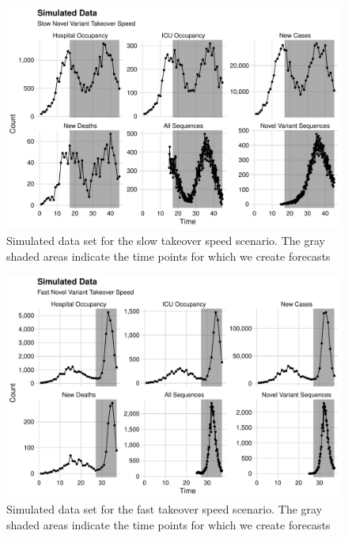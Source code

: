 \begin{figure}
    \centering
    \includegraphics[width=1.0\columnwidth]{simulated_binned_data_slow_plot}
    \caption[Simulated data set for the slow takeover speed scenario.]{Simulated data set for the slow takeover speed scenario.
    The gray shaded areas indicate the time points for which we create forecasts}
    \label{ch_5:fig:simulated_binned_data_slow_plot}
\end{figure}

\begin{figure}
    \centering
    \includegraphics[width=1.0\columnwidth]{simulated_binned_data_fast_plot}
    \caption[Simulated data set for the fast takeover speed scenario.]{Simulated data set for the fast takeover speed scenario.
    The gray shaded areas indicate the time points for which we create forecasts}
    \label{ch_5:fig:simulated_binned_data_fast_plot}
\end{figure}


